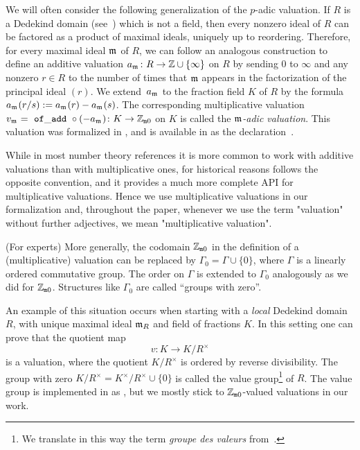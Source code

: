 \documentclass[sigplan,screen]{acmart}
\begin{document}
\begin{example}\label{example:adic_valuation}
We will often consider the following generalization of the $p$-adic valuation. If $R$ is a Dedekind domain (see~\cite[Chapitre~VII, \S2]{Bou85}) which is not a field, then every nonzero ideal of $R$ can be factored as a product of maximal ideals, uniquely up to reordering. Therefore, for every maximal ideal $\maxid[\empty]$ of $R$, we can follow an analogous construction to define an additive valuation $\av[{\maxid[\empty]}] \colon R \to \ZZ \cup \{ \infty\}$ on $R$ by sending $0$ to $\infty$ and any nonzero $r \in R$ to the number of times that $\mathfrak{m}$ appears in the factorization of the principal ideal $(r)$. We extend~$\av[{\maxid[\empty]}]$ to the fraction field $K$ of $R$ by the formula $\av[{\maxid[\empty]}](r/s):=\av[{\maxid[\empty]}](r)-\av[{\maxid[\empty]}](s)$. The corresponding multiplicative valuation $v_{\maxid[\empty]}=\mcode{of\_add}\circ (-\av[{\maxid[\empty]}])\colon K \to \wzmZZ$ on $K$ is called the \emph{$\mathfrak{m}$-adic valuation}. This valuation was formalized in \cite{deF22}, and is available in \mathlib as the declaration~\href{https://leanprover-community.github.io/mathlib_docs/ring_theory/dedekind_domain/adic_valuation.html#is_dedekind_domain.height_one_spectrum.valuation}{\extlink}.
\end{example}

While in most number theory references it is more common to work with additive valuations than with multiplicative ones, for historical reasons \mathlib follows the opposite convention, and it provides a much more complete API for multiplicative valuations. Hence we use multiplicative valuations in our formalization and, throughout the paper, whenever we use the term "valuation" without further adjectives, we mean "multiplicative valuation".

\begin{remark}\label{rmk:value_group}(For experts)
More generally, the codomain $\mathbb{Z}_{\mathtt{m}0}$ in the definition of a (multiplicative) valuation can be replaced by $\Gamma_0=\Gamma\cup\{0\}$, where $\Gamma$ is a linearly ordered commutative group. The order on $\Gamma$ is extended to $\Gamma_0$ analogously as we did for $\mathbb{Z}_{\mathtt{m}0}$. Structures like $\Gamma_0$ are called ``groups with zero''.
    
An example of this situation occurs when starting with a \emph{local} Dedekind domain $R$, with unique maximal ideal $\mathfrak{m}_{R}$ and field of fractions $K$. In this setting one can prove that the quotient map
 \[
v \colon K\rightarrow K/R^\times
\]
is a valuation, where the quotient $K/R^\times$ is ordered by reverse divisibility. The group with zero $K/R^\times=K^\times/R^\times\cup\{0\}$ is called the value group\footnote{We translate in this way the term \emph{groupe des valeurs} from~\cite[Chapitre~VI, \S3, n$^\circ$2]{Bou85}.} of $R$. The value group is implemented in \mathlib as \href{https://leanprover-community.github.io/mathlib_docs/ring_theory/valuation/valuation_ring.html#valuation_ring.value_group}{\extlink}, but we mostly stick to $\mathbb{Z}_{\mathtt{m}0}$-valued valuations in our work.
\end{remark}
\end{document}
